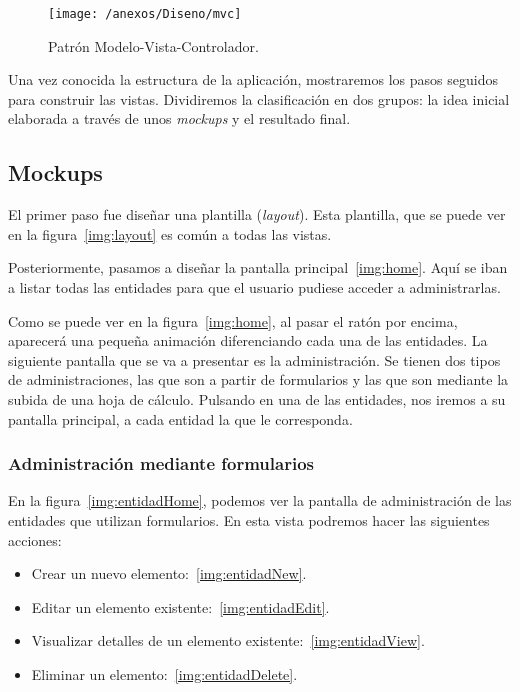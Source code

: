 \begin{figure}[h]
	\centering
	\texttt{[image: /anexos/Diseno/mvc]}
	\caption{Patrón Modelo-Vista-Controlador.~\cite{img:MVC}}
	\label{img:mvc}
\end{figure}

\newpage

Una vez conocida la estructura de la aplicación, mostraremos los pasos seguidos para construir las vistas. Dividiremos la clasificación en dos grupos: la idea inicial elaborada a través de unos \textit{mockups} y el resultado final.

\subsection{Mockups} 

El primer paso fue diseñar una plantilla (\textit{layout}). Esta plantilla, que se puede ver en la figura~\ref{img:layout} es común a todas las vistas.

Posteriormente, pasamos a diseñar la pantalla principal~\ref{img:home}. Aquí se iban a listar todas las entidades para que el usuario pudiese acceder a administrarlas.

Como se puede ver en la figura~\ref{img:home}, al pasar el ratón por encima, aparecerá una pequeña animación diferenciando cada una de las entidades. La siguiente pantalla que se va a presentar es la administración. Se tienen dos tipos de administraciones, las que son a partir de formularios y las que son mediante la subida de una hoja de cálculo. Pulsando en una de las entidades, nos iremos a su pantalla principal, a cada entidad la que le corresponda. 

\subsubsection{Administración mediante formularios} 

En la figura~\ref{img:entidadHome}, podemos ver la pantalla de administración de las entidades que utilizan formularios. En esta vista podremos hacer las siguientes acciones:

\begin{itemize}
	\item Crear un nuevo elemento:~\ref{img:entidadNew}.
	\item Editar un elemento existente:~\ref{img:entidadEdit}.
	\item Visualizar detalles de un elemento existente:~\ref{img:entidadView}.
	\item Eliminar un elemento:~\ref{img:entidadDelete}.
\end{itemize}

